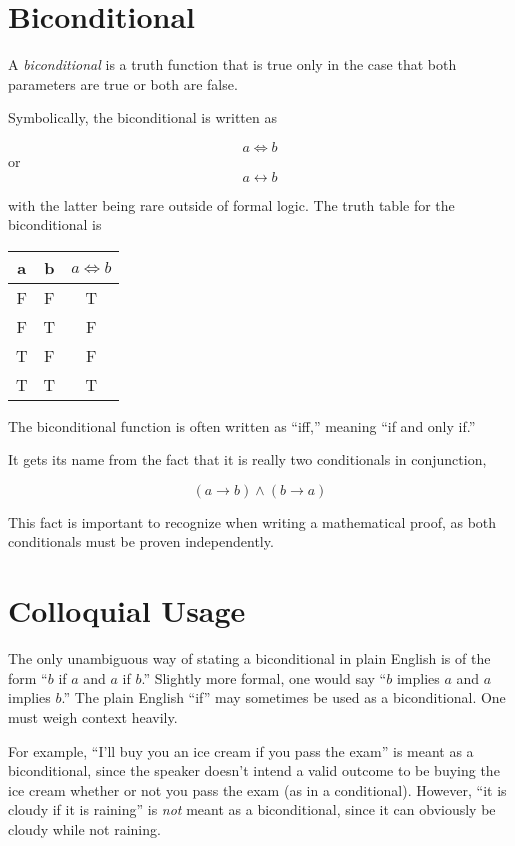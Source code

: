 \documentclass{article}
\begin{document}
\section{Biconditional}

A \emph{biconditional} is a truth function that is true only in the case that both parameters are true or both are false.  

Symbolically, the biconditional is written as

$$ a \Leftrightarrow b$$
or 
$$ a \leftrightarrow b$$ 

with the latter being rare outside of formal logic.  The truth table for the biconditional is

\begin{center}
\begin{tabular}{ccc}
a & b & $a \Leftrightarrow b$ \\ 
\hline 
F & F & T \\
F & T & F \\
T & F & F \\ 
T & T & T 
\end{tabular}
\end{center}

The biconditional function is often written as ``iff,'' meaning ``if and only if.''  

It  gets its name from the fact that it is really two conditionals in conjunction, 

$$ (a \rightarrow b) \land (b \rightarrow a) $$

This fact is important to recognize when writing a mathematical proof, as both conditionals must be proven independently.

\section{Colloquial Usage}

The only unambiguous way of stating a biconditional in plain English is of the form ``$b$ if $a$ and $a$ if $b$.''  Slightly more formal, one would say ``$b$ implies $a$ and $a$ implies $b$.''  The plain English ``if'' may sometimes be used as a biconditional.  One must weigh context heavily.

For example, ``I'll buy you an ice cream if you pass the exam'' is meant as a biconditional, since the speaker doesn't intend a valid outcome to be buying the ice cream whether or not you pass the exam (as in a conditional).   However, ``it is cloudy if it is raining'' is \emph{not} meant as a biconditional, since it can obviously be cloudy while not raining.
\end{document}
